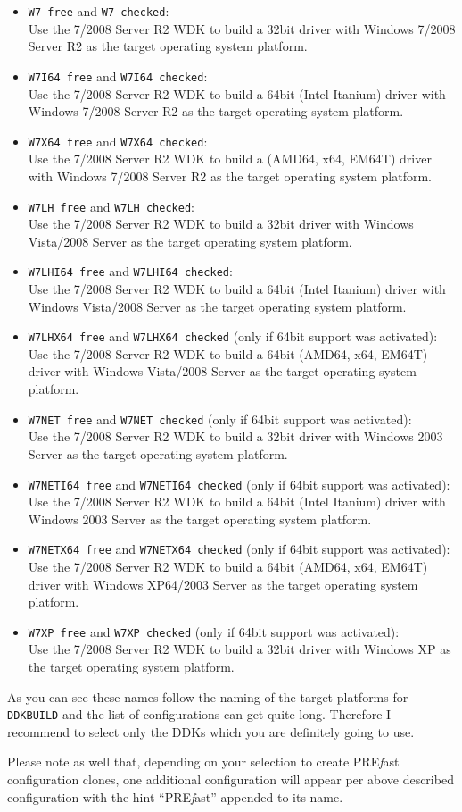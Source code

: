 \documentclass[a4paper,titlepage]{report}
\newcommand{\prefast}[0]{\textsf{PRE\textsl{f}ast}}
\newcommand{\solcfg}[2]{\texttt{#1 free} and \texttt{#1 checked}:\\#2}
\newcommand{\solcfgsixfour}[2]{\texttt{#1 free} and \texttt{#1 checked} \textcolor[gray]{0.40}{\textsf{\small(only if 64bit support was activated)}}:\\#2}
\begin{document}
\begin{itemize}
  \item \solcfg{W7}{Use the 7/2008 Server R2 WDK to build a 32bit driver with Windows 7/2008 Server R2 as the target operating system platform.}
  \item \solcfg{W7I64}{Use the 7/2008 Server R2 WDK to build a 64bit (Intel Itanium) driver with Windows 7/2008 Server R2 as the target operating system platform.}
  \item \solcfg{W7X64}{Use the 7/2008 Server R2 WDK to build a (AMD64, x64, EM64T) driver with Windows 7/2008 Server R2 as the target operating system platform.}
  \item \solcfg{W7LH}{Use the 7/2008 Server R2 WDK to build a 32bit driver with Windows Vista/2008 Server as the target operating system platform.}
  \item \solcfg{W7LHI64}{Use the 7/2008 Server R2 WDK to build a 64bit (Intel Itanium) driver with Windows Vista/2008 Server as the target operating system platform.}
  \item \solcfgsixfour{W7LHX64}{Use the 7/2008 Server R2 WDK to build a 64bit (AMD64, x64, EM64T) driver with Windows Vista/2008 Server as the target operating system platform.}
  \item \solcfgsixfour{W7NET}{Use the 7/2008 Server R2 WDK to build a 32bit driver with Windows 2003 Server as the target operating system platform.}
  \item \solcfgsixfour{W7NETI64}{Use the 7/2008 Server R2 WDK to build a 64bit (Intel Itanium) driver with Windows 2003 Server as the target operating system platform.}
  \item \solcfgsixfour{W7NETX64}{Use the 7/2008 Server R2 WDK to build a 64bit (AMD64, x64, EM64T) driver with Windows XP64/2003 Server as the target operating system platform.}
  \item \solcfgsixfour{W7XP}{Use the 7/2008 Server R2 WDK to build a 32bit driver with Windows XP as the target operating system platform.}
\end{itemize}

As you can see these names follow the naming of the target platforms for \texttt{DDKBUILD}
and the list of configurations can get quite long. Therefore I recommend to select only
the DDKs which you are definitely going to use.

Please note as well that, depending on your selection to create \prefast{} configuration
clones, one additional configuration will appear per above described configuration
with the hint ``\prefast{}'' appended to its name.
\end{document}
